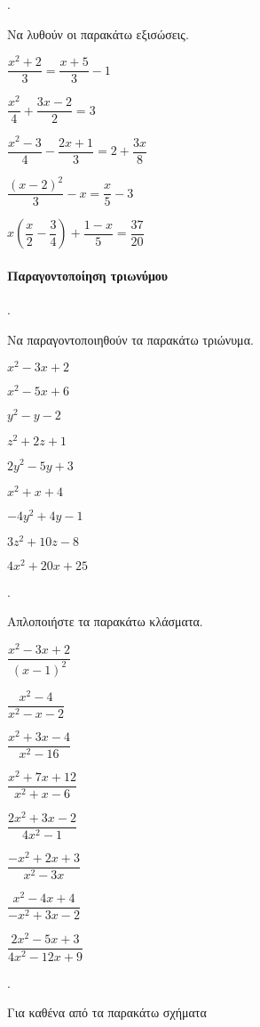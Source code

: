 \documentclass[11pt,a4paper,twocolumn]{article}
\newcounter{askhsh}
\newcommand{\askhsh}{{\large\theaskhsh.}\ \addtocounter{askhsh}{1}}
\begin{document}
\askhsh Να λυθούν οι παρακάτω εξισώσεις.
\begin{alist}
\item $\dfrac{x^2+2}{3}=\dfrac{x+5}{3}-1$
\item $\dfrac{x^2}{4}+\dfrac{3x-2}{2}=3$
\item $ \dfrac{x^2-3}{4}-\dfrac{2x+1}{3}=2+\dfrac{3x}{8} $
\item $ \dfrac{(x-2)^2}{3}-x=\dfrac{x}{5}-3 $
\item $ x\left(\dfrac{x}{2}-\dfrac{3}{4} \right)+\dfrac{1-x}{5}=\dfrac{37}{20}  $
\end{alist}
\paragraph{Παραγοντοποίηση τριωνύμου}
\askhsh Να παραγοντοποιηθούν τα παρακάτω τριώνυμα.
\begin{multicols}{2}
\begin{alist}
\item $ x^2-3x+2 $
\item $ x^2-5x+6 $
\item $ y^2-y-2 $
\item $ z^2+2z+1 $
\item $ 2y^2-5y+3 $
\item $ x^2+x+4 $
\item $ -4y^2+4y-1 $
\item $ 3z^2+10z-8 $
\item $ 4x^2+20x+25 $
\end{alist}
\end{multicols}
\askhsh Απλοποιήστε τα παρακάτω κλάσματα.
\begin{multicols}{2}
\begin{alist}
\item $\dfrac{x^2-3x+2}{(x-1)^2}$
\item $\dfrac{x^2-4}{x^2-x-2}$
\item $\dfrac{x^2+3x-4}{x^2-16}$
\item $\dfrac{x^2+7x+12}{x^2+x-6}$
\item $\dfrac{2x^2+3x-2}{4x^2-1}$
\item $\dfrac{-x^2+2x+3}{x^2-3x}$
\item $\dfrac{x^2-4x+4}{-x^2+3x-2}$
\item $\dfrac{2x^2-5x+3}{4x^2-12x+9}$
\end{alist}
\end{multicols}
\askhsh Για καθένα από τα παρακάτω σχήματα 
\end{document}
